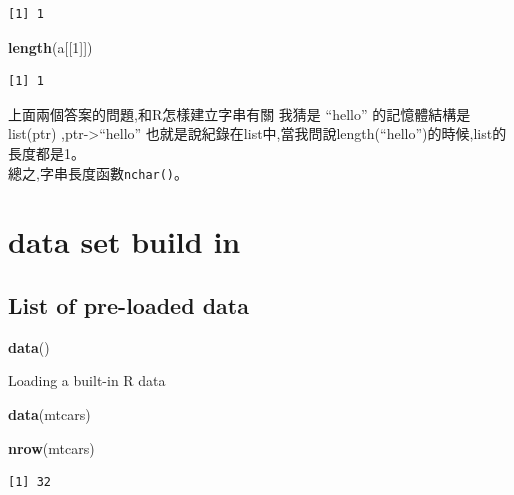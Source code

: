 \documentclass[]{book}
\newenvironment{Shaded}{\begin{snugshade}}{\end{snugshade}}
\newcommand{\DecValTok}[1]{\textcolor[rgb]{0.00,0.00,0.81}{#1}}
\newcommand{\KeywordTok}[1]{\textcolor[rgb]{0.13,0.29,0.53}{\textbf{#1}}}
\newcommand{\NormalTok}[1]{#1}
\theoremstyle{definition}
\theoremstyle{definition}
\theoremstyle{definition}
\theoremstyle{remark}
\begin{document}
\begin{verbatim}
[1] 1
\end{verbatim}

\begin{Shaded}
\begin{Highlighting}[]
\KeywordTok{length}\NormalTok{(a[[}\DecValTok{1}\NormalTok{]])}
\end{Highlighting}
\end{Shaded}

\begin{verbatim}
[1] 1
\end{verbatim}

上面兩個答案的問題,和R怎樣建立字串有關 我猜是 ``hello'' 的記憶體結構是
list(ptr) ,ptr-\textgreater{}``hello''
也就是說紀錄在list中,當我問說length(``hello'')的時候,list的長度都是1。\\
總之,字串長度函數\texttt{nchar()}。

\hypertarget{data-set-build-in}{%
\section{data set build in}\label{data-set-build-in}}

\hypertarget{list-of-pre-loaded-data}{%
\subsection{List of pre-loaded data}\label{list-of-pre-loaded-data}}

\begin{Shaded}
\begin{Highlighting}[]
\KeywordTok{data}\NormalTok{()}
\end{Highlighting}
\end{Shaded}

Loading a built-in R data

\begin{Shaded}
\begin{Highlighting}[]
\KeywordTok{data}\NormalTok{(mtcars) }
\end{Highlighting}
\end{Shaded}

\begin{Shaded}
\begin{Highlighting}[]
\KeywordTok{nrow}\NormalTok{(mtcars)}
\end{Highlighting}
\end{Shaded}

\begin{verbatim}
[1] 32
\end{verbatim}
\end{document}
